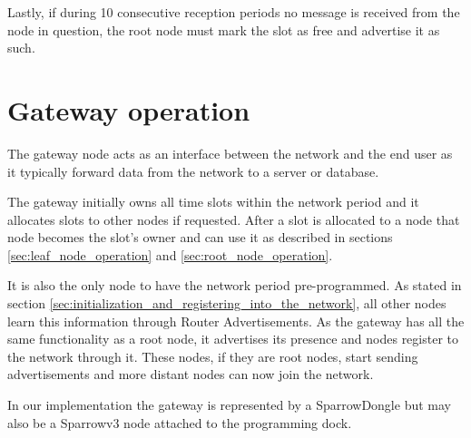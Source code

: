 Lastly, if during 10 consecutive reception periods no message is received from
the node in question, the root node must mark the slot as free and advertise it
as such.

\section{Gateway operation}

The gateway node acts as an interface between the network and the end user as
it typically forward data from the network to a server or database. 

The gateway initially owns all time slots within the network period and it
allocates slots to other nodes if requested. After a slot is allocated to a
node that node becomes the slot's owner and can use it as described in sections
\ref{sec:leaf_node_operation} and \ref{sec:root_node_operation}.

It is also the only node to have the network period pre-programmed. As stated
in section \ref{sec:initialization_and_registering_into_the_network}, all other
nodes learn this information through Router Advertisements. As the gateway has
all the same functionality as a root node, it advertises its presence and nodes
register to the network through it. These nodes, if they are root nodes, start
sending advertisements and more distant nodes can now join the network.

In our implementation the gateway is represented by a SparrowDongle but may
also be a Sparrowv3 node attached to the programming dock.

